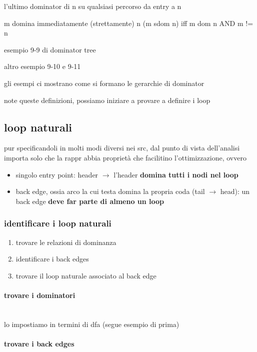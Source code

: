 l'ultimo dominator di n su qualsiasi percorso da entry a n

m domina immediatamente (strettamente) n (m sdom n) iff m dom n AND m != n

esempio 9-9 di dominator tree

altro esempio 9-10 e 9-11

gli esempi ci mostrano come si formano le gerarchie di dominator

note queste definizioni, possiamo iniziare a provare a definire i loop

\subsection{loop naturali}

pur specificandoli in molti modi diversi nei src, dal punto di vista dell'analisi importa solo che la rappr abbia propriet\`a che facilitino l'ottimizzazione, ovvero
\begin{itemize}
  \item singolo entry point: header $\rightarrow$ l'header \textbf{domina tutti i nodi nel loop}
  \item back edge, ossia arco la cui testa domina la propria coda (tail $\rightarrow$ head): un back edge \textbf{deve far parte di almeno un loop}
\end{itemize}

\subsubsection{identificare i loop naturali}

\begin{enumerate}
  \item trovare le relazioni di dominanza
  \item identificare i back edges
  \item trovare il loop naturale associato al back edge
\end{enumerate}

\paragraph{trovare i dominatori}~\\

lo impostiamo in termini di dfa (segue esempio di prima)

\paragraph{trovare i back edges}~\\

